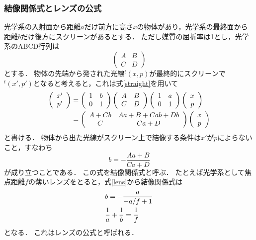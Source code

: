 \documentclass[titlepage]{jsarticle}
\begin{document}
\subsubsection{結像関係式とレンズの公式}
光学系の入射面から距離$a$だけ前方に高さ$x$の物体があり，光学系の最終面から距離$b$だけ後方にスクリーンがあるとする．
ただし媒質の屈折率は1とし，光学系のABCD行列は
\begin{equation}
    \left(
    \begin{array}{cc}
        A & B \\
        C & D
    \end{array}
    \right)
\end{equation}
とする．
物体の先端から発された光線$^t(x,p)$が最終的にスクリーンで$^t(x',p')$となると考えると，これは式\eqref{straight}を用いて
\begin{align}
    \left(
    \begin{array}{c}
        x' \\
        p'
    \end{array}
    \right)&=\left(
    \begin{array}{cc}
        1 & b \\
        0 & 1
    \end{array}
    \right)\left(
    \begin{array}{cc}
        A & B \\
        C & D
    \end{array}
    \right)\left(
    \begin{array}{cc}
        1 & a \\
        0 & 1
    \end{array}
    \right)\left(
    \begin{array}{c}
        x  \\
        p 
    \end{array}
    \right) \notag\\
    &=\left(
    \begin{array}{cc}
        A + Cb & Aa + B + Cab + Db \\
        C & Ca + D
    \end{array}
    \right)\left(
    \begin{array}{c}
        x  \\
        p 
    \end{array}
    \right)
\end{align}
と書ける．
物体から出た光線がスクリーン上で結像する条件は$x'$が$p$によらないこと，すなわち
\begin{equation}
    b = -\frac{Aa+B}{Ca+D}
\end{equation}
が成り立つことである．
この式を結像関係式と呼ぶ．
たとえば光学系として焦点距離$f$の薄いレンズをとると，式\eqref{lens}から結像関係式は
\begin{align}
    &b = - \frac{a}{-a/f + 1} \notag\\
    &\frac{1}{a} + \frac{1}{b} = \frac{1}{f} \label{abf}
\end{align}
となる．
これはレンズの公式と呼ばれる．
\end{document}
